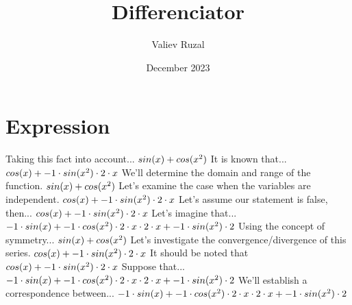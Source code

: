\documentclass[a4paper, 12pt]{article}
\title{ Differenciator }
\author{Valiev Ruzal}
\date{December 2023}
\begin{document}
\maketitle
\section{Expression}
Taking this fact into account...\newline
$ sin( x )  +  cos(  { x } ^ {\small 2 }  ) $\newline
It is known that...\newline
$ cos( x )  + -1 \cdot  sin(  { x } ^ {\small 2 }  )  \cdot 2 \cdot x$\newline
We'll determine the domain and range of the function.\newline
$ sin( x )  +  cos(  { x } ^ {\small 2 }  ) $\newline
Let's examine the case when the variables are independent.\newline
$ cos( x )  + -1 \cdot  sin(  { x } ^ {\small 2 }  )  \cdot 2 \cdot x$\newline
Let's assume our statement is false, then...\newline
$ cos( x )  + -1 \cdot  sin(  { x } ^ {\small 2 }  )  \cdot 2 \cdot x$\newline
Let's imagine that...\newline
$-1 \cdot  sin( x )  + -1 \cdot  cos(  { x } ^ {\small 2 }  )  \cdot 2 \cdot x \cdot 2 \cdot x + -1 \cdot  sin(  { x } ^ {\small 2 }  )  \cdot 2$\newline
Using the concept of symmetry...\newline
$ sin( x )  +  cos(  { x } ^ {\small 2 }  ) $\newline
Let's investigate the convergence/divergence of this series.\newline
$ cos( x )  + -1 \cdot  sin(  { x } ^ {\small 2 }  )  \cdot 2 \cdot x$\newline
It should be noted that\newline
$ cos( x )  + -1 \cdot  sin(  { x } ^ {\small 2 }  )  \cdot 2 \cdot x$\newline
Suppose that...\newline
$-1 \cdot  sin( x )  + -1 \cdot  cos(  { x } ^ {\small 2 }  )  \cdot 2 \cdot x \cdot 2 \cdot x + -1 \cdot  sin(  { x } ^ {\small 2 }  )  \cdot 2$\newline
We'll establish a correspondence between...\newline
$-1 \cdot  sin( x )  + -1 \cdot  cos(  { x } ^ {\small 2 }  )  \cdot 2 \cdot x \cdot 2 \cdot x + -1 \cdot  sin(  { x } ^ {\small 2 }  )  \cdot 2$\newline
\end{document}

